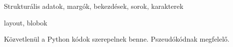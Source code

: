 
Strukturális adatok, margók, bekezdések, sorok, karakterek

layout, blobok

Közvetlenül a Python kódok szerepelnek benne. Pszeudókódnak megfelelő.

